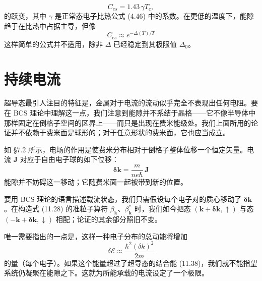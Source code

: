 \begin{equation*}
C_{es} = 1.43\,\gamma T_c, \tag{11.50}
\end{equation*}
的跃变，其中 $\gamma$ 是正常态电子比热公式 (4.46) 中的系数。在更低的温度下，能隙趋于在比热中占据主导，但像
\begin{equation*}
C_{es} \approx e^{-\Delta(T)/T} \tag{11.51}
\end{equation*}
这样简单的公式并不适用，除非 $\Delta$ 已经稳定到其极限值 $\Delta_0$。


\section{持续电流}

超导态最引人注目的特征是，金属对于电流的流动似乎完全不表现出任何电阻。要在 BCS 理论中理解这一点，我们注意到能隙并不系结于晶格——它不像半导体中那样固定在倒格子空间的区界上——而只是出现在费米能级处。我们上面所用的论证并不依赖于费米面是球形的；对于任意形状的费米面，它也应当成立。

如 §7.2 所示，电场的作用是使费米分布相对于倒格子整体位移一个恒定矢量。电流 $\mathbf{J}$ 对应于自由电子球的如下位移：
\begin{equation*}
\boldsymbol{\delta}\mathbf{k} = \frac{m}{ne\hbar}\,\mathbf{J} \tag{11.52}
\end{equation*}
能隙并不妨碍这一移动；它随费米面一起被带到新的位置。

要用 BCS 理论的语言描述载流状态，我们只需假设每个电子对的质心移动了 $\boldsymbol{\delta}\mathbf{k}$。在构造式 (11.28) 的准粒子算符 $\beta_{\mathbf{k}}$、$\beta_{\mathbf{k}}^{*}$ 时，我们如今把态 $(\mathbf{k}+\boldsymbol{\delta}\mathbf{k},\uparrow)$ 与态 $(-\mathbf{k}+\boldsymbol{\delta}\mathbf{k},\downarrow)$ 相配；论证的其余部分照旧不变。


唯一需要指出的一点是，这样一种电子分布的总动能将增加
\begin{equation*}
\delta\mathcal{E} \approx \frac{\hbar^{2}(\delta k)^{2}}{2m} \tag{11.53}
\end{equation*}
的量（每个电子）。如果这个能量超过了超导态的结合能 (11.38)，我们就不能指望系统仍凝聚在能隙之下。这就为所能承载的电流设定了一个极限。

